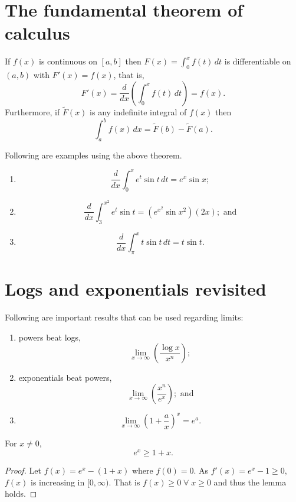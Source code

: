 \section{The fundamental theorem of calculus}

\begin{theorem}
    If $f(x)$ is continuous on $[a,b]$ then $F(x)=\int^x_0{f(t)\,dt}$ is differentiable on $(a,b)$ with $F'(x)=f(x)$, that is, \[F'(x)=\dfrac{d}{dx}\left(\int^x_0f(t)\,dt\right)=f(x).\] Furthermore, if $\tilde F(x)$ is any indefinite integral of $f(x)$ then \[\int^b_a{f(x)\,dx}=\tilde F(b)-\tilde F(a).\]
\end{theorem}

\begin{example}
    Following are examples using the above theorem.
    \begin{enumerate}
        \item \[\dfrac d{dx}\int^x_0{e^t\sin{t}\,dt=e^x\sin{x}};\]
        \item \[\dfrac d{dx}\int^{x^2}_3{e^t\sin{t}}=(e^{x^2}\sin{x^2})(2x);\text{ and}\]
        \item \[\dfrac d{dx}\int^x_\pi t\sin{t}\,dt=t\sin{t}.\]
    \end{enumerate}
\end{example}

\section{Logs and exponentials revisited}

Following are important results that can be used regarding limits:

\begin{enumerate}
    \item powers beat logs, \[\lim_{x\to\infty}\left(\dfrac{\log{x}}{x^n}\right);\]
    \item exponentials beat powers, \[\lim_{x\to\infty}\left(\dfrac{x^n}{e^x}\right);\text{ and}\]
    \item \[\lim_{x\to\infty}\left(1+\dfrac ax\right)^x=e^a.\]
\end{enumerate}

\begin{lemma}
    For $x\neq 0$, \[e^x\geq 1+x.\]
\end{lemma}

\begin{proof}
    Let $f(x)=e^x-(1+x)$ where $f(0)=0$. As $f'(x)=e^x-1\geq0$, $f(x)$ is increasing in $[0,\infty)$. That is $f(x)\geq0\;\forall\;x\geq0$ and thus the lemma holds.
\end{proof}

